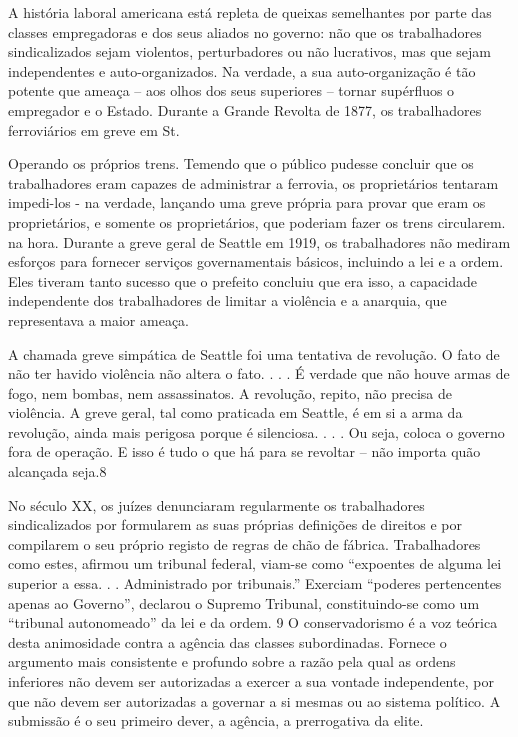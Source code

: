 A história laboral americana está repleta de queixas semelhantes por parte das classes empregadoras e dos seus aliados no governo: não que os trabalhadores sindicalizados sejam violentos, perturbadores ou não lucrativos, mas que sejam independentes e auto-organizados. Na verdade, a sua auto-organização é tão potente que ameaça – aos olhos dos seus superiores – tornar supérfluos o empregador e o Estado. Durante a Grande Revolta de 1877, os trabalhadores ferroviários em greve em St.
 \par 
Operando os próprios trens. Temendo que o público pudesse concluir que os trabalhadores eram capazes de administrar a ferrovia, os proprietários tentaram impedi-los - na verdade, lançando uma greve própria para provar que eram os proprietários, e somente os proprietários, que poderiam fazer os trens circularem. na hora. Durante a greve geral de Seattle em 1919, os trabalhadores não mediram esforços para fornecer serviços governamentais básicos, incluindo a lei e a ordem. Eles tiveram tanto sucesso que o prefeito concluiu que era isso, a capacidade independente dos trabalhadores de limitar a violência e a anarquia, que representava a maior ameaça.
 \par 
A chamada greve simpática de Seattle foi uma tentativa de revolução. O fato de não ter havido violência não altera o fato. . . . É verdade que não houve armas de fogo, nem bombas, nem assassinatos. A revolução, repito, não precisa de violência. A greve geral, tal como praticada em Seattle, é em si a arma da revolução, ainda mais perigosa porque é silenciosa. . . . Ou seja, coloca o governo fora de operação. E isso é tudo o que há para se revoltar – não importa quão alcançada seja.{\color{blue}8}
 \par 
No século XX, os juízes denunciaram regularmente os trabalhadores sindicalizados por formularem as suas próprias definições de direitos e por compilarem o seu próprio registo de regras de chão de fábrica. Trabalhadores como estes, afirmou um tribunal federal, viam-se como “expoentes de alguma lei superior a essa. . . Administrado por tribunais.” Exerciam “poderes pertencentes apenas ao Governo”, declarou o Supremo Tribunal, constituindo-se como um “tribunal autonomeado” da lei e da ordem. {\color{blue}9} O conservadorismo é a voz teórica desta animosidade contra a agência das classes subordinadas. Fornece o argumento mais consistente e profundo sobre a razão pela qual as ordens inferiores não devem ser autorizadas a exercer a sua vontade independente, por que não devem ser autorizadas a governar a si mesmas ou ao sistema político. A submissão é o seu primeiro dever, a agência, a prerrogativa da elite.

